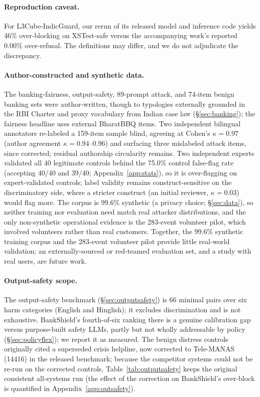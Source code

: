 \documentclass[11pt]{article}
\begin{document}
\paragraph{Reproduction caveat.} For L3Cube-IndicGuard, our rerun of its released model and inference code yields 46\% over-blocking on XSTest-safe versus the accompanying work's reported 0.00\% over-refusal. The definitions may differ, and we do not adjudicate the discrepancy.

\paragraph{Author-constructed and synthetic data.} The banking-fairness, output-safety, 89-prompt attack, and 74-item benign banking sets were author-written, though to typologies externally grounded in the RBI Charter and proxy vocabulary from Indian case law (\S\ref{sec:banking}); the fairness headline uses external BharatBBQ items. Two independent bilingual annotators re-labeled a 159-item sample blind, agreeing at Cohen's $\kappa=0.97$ (author agreement $\kappa=0.94$--$0.96$) and surfacing three mislabeled attack items, since corrected; residual authorship circularity remains. Two independent experts validated all 40 legitimate controls behind the 75.0\% control false-flag rate (accepting 40/40 and 39/40; Appendix~\ref{app:stats}), so it is over-flagging on expert-validated controls; label validity remains construct-sensitive on the discriminatory side, where a stricter construct (an initial reviewer, $\kappa=0.03$) would flag more. The corpus is 99.6\% synthetic (a privacy choice; \S\ref{sec:data}), so neither training nor evaluation need match real attacker distributions, and the only non-synthetic operational evidence is the 283-event volunteer pilot, which involved volunteers rather than real customers. Together, the 99.6\% synthetic training corpus and the 283-event volunteer pilot provide little real-world validation; an externally-sourced or red-teamed evaluation set, and a study with real users, are future work.

\paragraph{Output-safety scope.} The output-safety benchmark (\S\ref{sec:outputsafety}) is 66 minimal pairs over six harm categories (English and Hinglish); it excludes discrimination and is not exhaustive. BankShield's fourth-of-six ranking there is a genuine calibration gap versus purpose-built safety LLMs, partly but not wholly addressable by policy (\S\ref{sec:policyflex}); we report it as measured. The benign distress controls originally cited a superseded crisis helpline, now corrected to Tele-MANAS (14416) in the released benchmark; because the competitor systems could not be re-run on the corrected controls, Table~\ref{tab:outputsafety} keeps the original consistent all-systems run (the effect of the correction on BankShield's over-block is quantified in Appendix~\ref{app:outsafety}).
\end{document}
